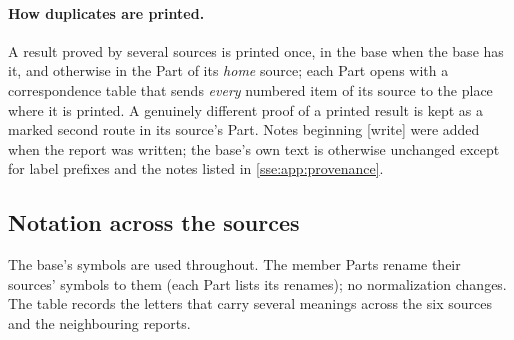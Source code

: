 \documentclass[11pt,a4paper]{article}
\numberwithin{equation}{section}
\theoremstyle{plain}
\theoremstyle{definition}
\theoremstyle{remark}
\newcommand{\wtag}{\textup{\textsf{[write]}}}%
\begin{document}
\paragraph{How duplicates are printed.} A result proved by several sources
is printed once, in the base when the base has it, and otherwise in the Part
of its \emph{home} source; each Part opens with a correspondence table that
sends \emph{every} numbered item of its source to the place where it is
printed. A genuinely different proof of a printed result is kept as a marked
second route in its source's Part. Notes beginning \wtag{} were added when
the report was written; the base's own text is otherwise unchanged except
for label prefixes and the notes listed in \cref{sse:app:provenance}.

\subsection{Notation across the sources}\label{sse:sec:conventions}
The base's symbols are used throughout. The member Parts rename their
sources' symbols to them (each Part lists its renames); no normalization
changes. The table records the letters that carry several meanings across
the six sources and the neighbouring reports.
\end{document}
